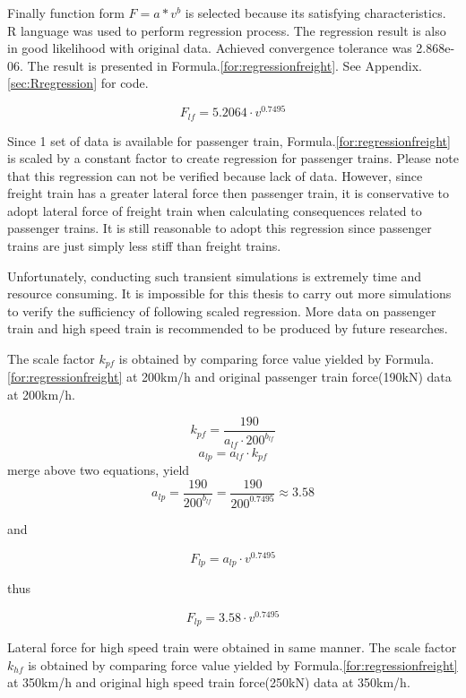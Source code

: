 Finally function form $F=a*v^b$ is selected because its satisfying characteristics. R language was used to perform regression process. The regression result is also in good likelihood with original data. Achieved convergence tolerance was 2.868e-06. The result is presented in Formula.\ref{for:regressionfreight}. See Appendix.\ref{sec:Rregression} for code.

\begin{equation}
\label{for:regressionfreight}
F_{lf} = 5.2064\cdot v^{0.7495}
\end{equation}

Since 1 set of data is available for passenger train, Formula.\ref{for:regressionfreight} is scaled by a constant factor to create regression for passenger trains. Please note that this regression can not be verified because lack of data. However, since freight train has a greater lateral force then passenger train, it is conservative to adopt lateral force of freight train when calculating consequences related to passenger trains. It is still reasonable to adopt this regression since passenger trains are just simply less stiff than freight trains. 

Unfortunately, conducting such transient simulations is extremely time and resource consuming. It is impossible for this thesis to carry out more simulations to verify the sufficiency of following scaled regression. More data on passenger train and high speed train is recommended to be produced by future researches.

The scale factor $k_{pf}$ is obtained by comparing force value yielded by Formula.\ref{for:regressionfreight} at 200km/h and original passenger train force(190kN) data at 200km/h.

$$k_{pf} = \frac{190}{a_{lf}\cdot 200^{b_{lf}}}$$
$$a_{lp} = a_{lf}\cdot k_{pf}$$
merge above two equations, yield
$$a_{lp} = \frac{190}{200^{b_{lf}}} = \frac{190}{200^{0.7495}} \approx 3.58$$

and 

$$F_{lp} = a_{lp}\cdot v^{0.7495}$$

thus

\begin{equation}\label{for:regressionpassenger}
F_{lp} = 3.58\cdot v^{0.7495}
\end{equation}

Lateral force for high speed train were obtained in same manner. The scale factor $k_{hf}$ is obtained by comparing force value yielded by Formula.\ref{for:regressionfreight} at 350km/h and original high speed train force(250kN) data at 350km/h.

